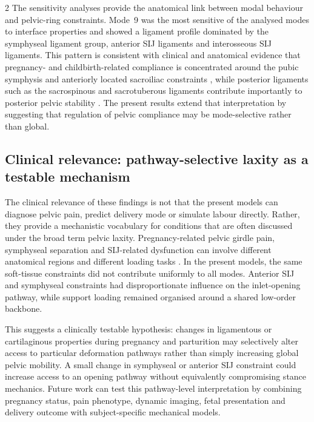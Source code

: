 \documentclass[openacc]{rsproca_new}
\begin{document}
\begin{multicols}{2}
The sensitivity analyses provide the anatomical link between modal behaviour and pelvic-ring constraints. Mode~9 was the most sensitive of the analysed modes to interface properties and showed a ligament profile dominated by the symphyseal ligament group, anterior SIJ ligaments and interosseous SIJ ligaments. This pattern is consistent with clinical and anatomical evidence that pregnancy- and childbirth-related compliance is concentrated around the pubic symphysis and anteriorly located sacroiliac constraints \cite{Damen2001,Pires2015,Cicek2015,Fiani2021}, while posterior ligaments such as the sacrospinous and sacrotuberous ligaments contribute importantly to posterior pelvic stability \cite{Hammer2019,Aldabe2019}. The present results extend that interpretation by suggesting that regulation of pelvic compliance may be mode-selective rather than global.

\subsection{Clinical relevance: pathway-selective laxity as a testable mechanism}

The clinical relevance of these findings is not that the present models can diagnose pelvic pain, predict delivery mode or simulate labour directly. Rather, they provide a mechanistic vocabulary for conditions that are often discussed under the broad term pelvic laxity. Pregnancy-related pelvic girdle pain, symphyseal separation and SIJ-related dysfunction can involve different anatomical regions and different loading tasks \cite{Damen2001,Vleeming2012,Kiapour2019,Stolarczyk2021}. In the present models, the same soft-tissue constraints did not contribute uniformly to all modes. Anterior SIJ and symphyseal constraints had disproportionate influence on the inlet-opening pathway, while support loading remained organised around a shared low-order backbone.

This suggests a clinically testable hypothesis: changes in ligamentous or cartilaginous properties during pregnancy and parturition may selectively alter access to particular deformation pathways rather than simply increasing global pelvic mobility. A small change in symphyseal or anterior SIJ constraint could increase access to an opening pathway without equivalently compromising stance mechanics. Future work can test this pathway-level interpretation by combining pregnancy status, pain phenotype, dynamic imaging, fetal presentation and delivery outcome with subject-specific mechanical models.


\end{multicols}
\end{document}

